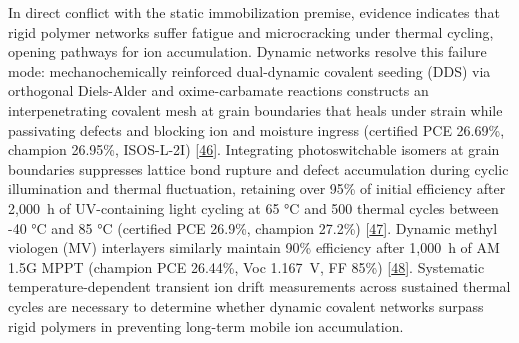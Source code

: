 \documentclass[
  11pt,
]{article}
\begin{document}
In direct conflict with the static immobilization premise, evidence
indicates that rigid polymer networks suffer fatigue and microcracking
under thermal cycling, opening pathways for ion accumulation. Dynamic
networks resolve this failure mode: mechanochemically reinforced
dual-dynamic covalent seeding (DDS) via orthogonal Diels-Alder and
oxime-carbamate reactions constructs an interpenetrating covalent mesh
at grain boundaries that heals under strain while passivating defects
and blocking ion and moisture ingress (certified PCE 26.69\%, champion
26.95\%, ISOS-L-2I) {[}\href{https://doi.org/10.1002/adma.72823}{46}{]}.
Integrating photoswitchable isomers at grain boundaries suppresses
lattice bond rupture and defect accumulation during cyclic illumination
and thermal fluctuation, retaining over 95\% of initial efficiency after
2,\qty{000}{\hour} of UV-containing light cycling at 65 °C and 500
thermal cycles between -40 °C and 85 °C (certified PCE 26.9\%, champion
27.2\%) {[}\href{https://doi.org/10.1038/s41560-026-01993-z}{47}{]}.
Dynamic methyl viologen (MV) interlayers similarly maintain 90\%
efficiency after 1,\qty{000}{\hour} of AM 1.5G MPPT (champion PCE
26.44\%, Voc \qty{1.167}{\volt}, FF 85\%)
{[}\href{https://doi.org/10.1002/adfm.202530317}{48}{]}. Systematic
temperature-dependent transient ion drift measurements across sustained
thermal cycles are necessary to determine whether dynamic covalent
networks surpass rigid polymers in preventing long-term mobile ion
accumulation.
\end{document}
